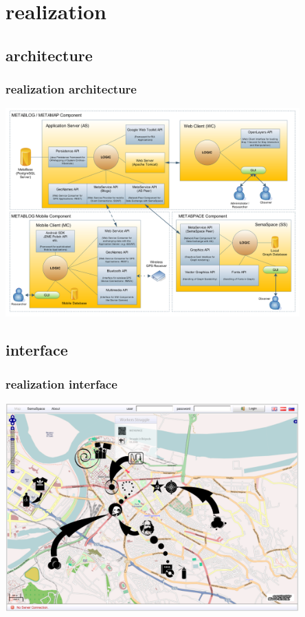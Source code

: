 \documentclass[blue]{beamer}
\begin{document}


\section{realization}
\subsection{architecture}
\frame
{
\frametitle{\textbf{realization architecture}}
\includegraphics[width=0.85\textwidth]{bin/architecture/component-diagram_update.png}
}

\subsection{interface}
\frame
{
\frametitle{\textbf{realization interface}}
\includegraphics[width=0.85\textwidth]{bin/features/metamap/01_gui_metamap_start_update.png}
}
\end{document}
